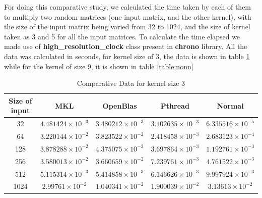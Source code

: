 \documentclass[a4paper]{article}
\begin{document}
For doing this comparative study, we calculated the time taken by each of them to multiply two random matrices (one input matrix, and the other kernel), with the size of the input matrix being varied from 32 to 1024, and the size of kernel taken as 3 and 5 for all the input matrices. To calculate the time elapsed we made use of \textbf{high\_resolution\_clock} class present in \textbf{chrono} library. All the data was calculated in seconds, for kernel size of 3, the data is shown in table \ref{table:nonlin} while for the kernel of size 9, it is shown in table \ref{table:nonn}

\begin{table}[ht]
\caption{Comparative Data for kernel size 3} %
\centering %
\begin{tabular}{c c c c c} %
\hline\hline %
Size of input & MKL & OpenBlas & Pthread & Normal \\ [0.5ex] %
\hline %
32 & $4.481424\times 10^{-3}$ & $3.480212\times 10^{-3}$ & $3.102635\times 10^{-3}$ & $6.335516\times 10^{-5}$  \\
64 & $3.220144\times 10^{-2}$ & $3.823522\times 10^{-2}$ & $2.418458\times 10^{-3}$ & $2.683123\times 10^{-4}$  \\
128 & $3.878288\times 10^{-2}$ & $4.375075\times 10^{-2}$ & $3.697864\times 10^{-3}$ & $1.192761\times 10^{-3}$  \\
256 & $3.580013\times 10^{-2}$ & $3.660659\times 10^{-2}$ & $7.239761\times 10^{-3}$ & $4.761522\times 10^{-3}$  \\
512 & $5.115314\times 10^{-3}$ & $5.414858\times 10^{-3}$ & $6.146626\times 10^{-3}$ & $9.997924\times 10^{-3}$  \\
1024 & $2.99761\times 10^{-2}$ & $1.040341\times 10^{-2}$ & $1.900039\times 10^{-2}$ & $3.13613\times 10^{-2}$  \\[1ex] %
\hline %
\end{tabular}
\label{table:nonlin} %
\end{table}
\end{document}
